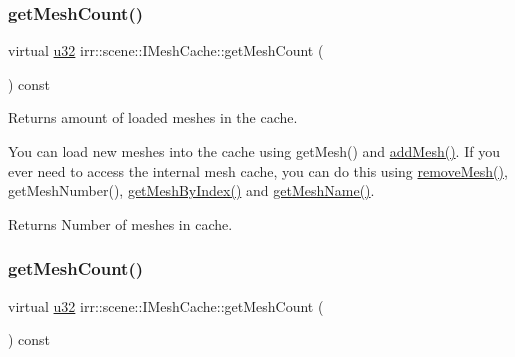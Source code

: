 \subsubsection{\texorpdfstring{get\+Mesh\+Count()}{getMeshCount()}\hspace{0.1cm}{\footnotesize\ttfamily [1/2]}}
{\footnotesize\ttfamily virtual \hyperlink{namespaceirr_a0416a53257075833e7002efd0a18e804}{u32} irr\+::scene\+::\+I\+Mesh\+Cache\+::get\+Mesh\+Count (\begin{DoxyParamCaption}{ }\end{DoxyParamCaption}) const\hspace{0.3cm}{\ttfamily [pure virtual]}}



Returns amount of loaded meshes in the cache. 

You can load new meshes into the cache using get\+Mesh() and \hyperlink{classirr_1_1scene_1_1IMeshCache_a2959812a3a393817b1db42761766c49b}{add\+Mesh()}. If you ever need to access the internal mesh cache, you can do this using \hyperlink{classirr_1_1scene_1_1IMeshCache_aa82078b06fdcaa332b44a59e4027f921}{remove\+Mesh()}, get\+Mesh\+Number(), \hyperlink{classirr_1_1scene_1_1IMeshCache_a06e7755013445f9bc3d7339fbd009e31}{get\+Mesh\+By\+Index()} and \hyperlink{classirr_1_1scene_1_1IMeshCache_af06efb8fb21f6bba16e52d879b5d3ddd}{get\+Mesh\+Name()}. \begin{DoxyReturn}{Returns}
Number of meshes in cache. 
\end{DoxyReturn}
\mbox{\label{classirr_1_1scene_1_1IMeshCache_a9dc99e46309a6ef494ef7672c9b49853}} 
\subsubsection{\texorpdfstring{get\+Mesh\+Count()}{getMeshCount()}\hspace{0.1cm}{\footnotesize\ttfamily [2/2]}}
{\footnotesize\ttfamily virtual \hyperlink{namespaceirr_a0416a53257075833e7002efd0a18e804}{u32} irr\+::scene\+::\+I\+Mesh\+Cache\+::get\+Mesh\+Count (\begin{DoxyParamCaption}{ }\end{DoxyParamCaption}) const\hspace{0.3cm}{\ttfamily [pure virtual]}}



